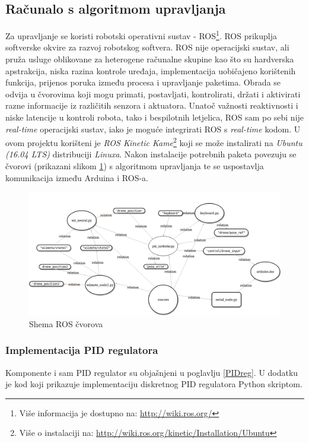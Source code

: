 \documentclass[times, utf8, diplomski]{fer}
\begin{document}
\subsection{Računalo s algoritmom upravljanja}\label{sec:algoritam}
Za upravljanje se koristi robotski operativni sustav - ROS\footnote{Više informacija je dostupno na: \url{http://wiki.ros.org/}}. ROS prikuplja softverske okvire za razvoj robotskog softvera. ROS nije operacijski sustav, ali pruža usluge oblikovane za heterogene računalne skupine kao što su hardverska apstrakcija, niska razina kontrole uređaja, implementacija uobičajeno korištenih funkcija, prijenos poruka između procesa i upravljanje paketima. Obrada se odvija u čvorovima  koji mogu primati, postavljati, kontrolirati,  držati i aktivirati razne informacije iz različitih senzora i aktuatora. Unatoč važnosti reaktivnosti i niske latencije u kontroli robota, tako i bespilotnih letjelica, ROS sam po sebi nije \emph{real-time} operacijski sustav, iako je moguće integrirati ROS s \emph{real-time} kodom. U ovom projektu korišteni je \emph{ROS Kinetic Kame}\footnote{Više o instalaciji na: \url{http://wiki.ros.org/kinetic/Installation/Ubuntu}} koji se može instalirati na \emph{Ubuntu  (16.04 LTS)} distribuciji \emph{Linuxa}. Nakon instalacije potrebnih paketa povezuju se čvorovi (prikazani slikom \ref{fig:cvoroviROS}) s algoritmom upravljanja te se uspostavlja komunikacija između Arduina i ROS-a.
\begin{figure}[htb]
\centering
\includegraphics[width=13cm]{img/diagram.png}
\caption{Shema ROS čvorova}
\label{fig:cvoroviROS}
\end{figure}

\subsubsection{Implementacija PID regulatora}
Komponente i sam PID regulator su objašnjeni u poglavlju \ref{PIDreg}. U dodatku je kod koji prikazuje implementaciju diskretnog PID regulatora Python skriptom.
%
\end{document}
